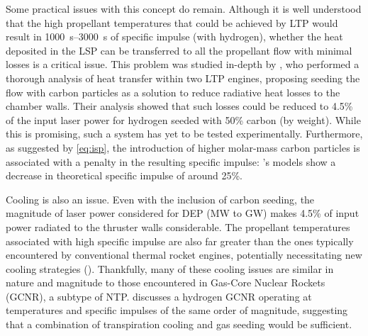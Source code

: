         Some practical issues with this concept do remain. Although it is well understood that the high propellant temperatures that could be achieved by LTP would result in \qtyrange{1000}{3000}{s} of specific impulse (with hydrogen), whether the heat deposited in the LSP can be transferred to all the propellant flow with minimal losses is a critical issue. This problem was studied in-depth by \textcite{shojiPerformanceHeatTransfer1976}, who performed a thorough analysis of heat transfer within two LTP engines, proposing seeding the flow with carbon particles as a solution to reduce radiative heat losses to the chamber walls. Their analysis showed that such losses could be reduced to 4.5\% of the input laser power for hydrogen seeded with 50\% carbon (by weight). While this is promising, such a system has yet to be tested experimentally. Furthermore, as suggested by \autoref{eq:isp}, the introduction of higher molar-mass carbon particles is associated with a penalty in the resulting specific impulse: \citeauthor{shojiPerformanceHeatTransfer1976}'s models show a decrease in theoretical specific impulse of around 25\%.

        Cooling is also an issue. Even with the inclusion of carbon seeding, the magnitude of laser power considered for DEP (MW to GW) makes 4.5\% of input power radiated to the thruster walls considerable. The propellant temperatures associated with high specific impulse are also far greater than the ones typically encountered by conventional thermal rocket engines, potentially necessitating new cooling strategies (\textcite{noredApplicationHighPower1976}). Thankfully, many of these cooling issues are similar in nature and magnitude to those encountered in Gas-Core Nuclear Rockets (GCNR), a subtype of NTP. \textcite{kascakNozzleCavityWall1971} discusses a hydrogen GCNR operating at temperatures and specific impulses of the same order of magnitude, suggesting that a combination of transpiration cooling and gas seeding would be sufficient.

